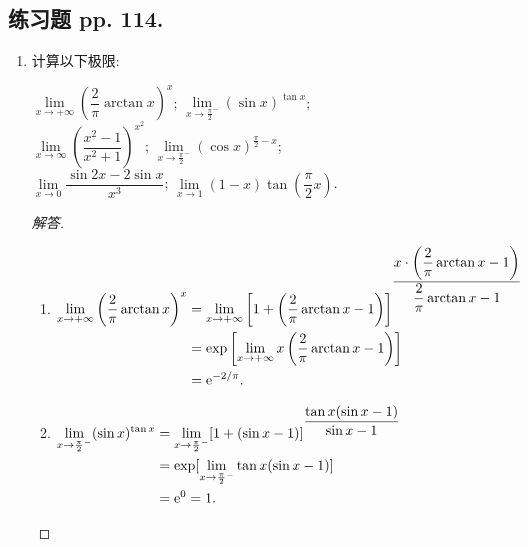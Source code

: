 \documentclass[UTF8,a4paper,11pt,twoside]{book}
\newcommand{\e}{\mathrm e}
\begin{document}
\subsection{练习题 pp. 114.}
\begin{enumerate}
	\item 计算以下极限:
	      \begin{tabenum}[(1)]
		      \tabenumitem $\lim\limits_{x\to+\infty} \left(\dfrac{2}{\pi}\arctan{x}\right)^x$;
		      \tabenumitem $\lim\limits_{x\to\frac{\pi}{2}^{-}} (\sin{x})^{\tan{x}}$;\\
		      \tabenumitem $\lim\limits_{x\to\infty} \left(\dfrac{x^2-1}{x^2+1}\right)^{x^2}$;
		      \tabenumitem $\lim\limits_{x\to\frac{\pi}{2}^{-}} (\cos{x})^{\frac{\pi}{2}-x}$;\\
		      \tabenumitem $\lim\limits_{x\to 0} \dfrac{\sin{2x}-2\sin{x}}{x^3}$;
		      \tabenumitem $\lim\limits_{x\to 1} (1-x)\tan\left(\dfrac{\pi}{2}x\right)$.
	      \end{tabenum}

	      \begin{proof}[解答]
		      \begin{enumerate}[(1)]
			      \item $\begin{aligned}[t]
					            \lim\limits_{x\to+\infty} \left(\dfrac{2}{\pi}\arctan{x}\right)^x & =  \lim\limits_{x\to+\infty} \left[1+\left(\dfrac{2}{\pi}\arctan{x}-1\right)\right]^{\dfrac{x\cdot\left(\dfrac{2}{\pi}\arctan{x}-1\right)}{\dfrac{2}{\pi}\arctan{x}-1}} \\
					                                                                              & =                                                                   {\rm exp}\left[\lim\limits_{x\to+\infty} x\left(\dfrac{2}{\pi}\arctan{x}-1\right)\right]           \\
					                                                                              & =                                                                   \e^{-2/\pi}.
				            \end{aligned}$

			      \item $\begin{aligned}[t]
					            \lim\limits_{x\to\frac{\pi}{2}^{-}} (\sin{x})^{\tan{x}} & =\lim\limits_{x\to\frac{\pi}{2}^{-}} [1+(\sin{x}-1)]^{\dfrac{\tan{x}(\sin{x}-1)}{\sin{x}-1}} \\
					                                                                    & = {\rm exp}[\lim\limits_{x\to\frac{\pi}{2}^{-}} \tan{x}(\sin{x}-1)]                          \\
					                                                                    & = \e^0=1.
				            \end{aligned}$


\end{enumerate}
\end{proof}
\end{enumerate}
\end{document}
